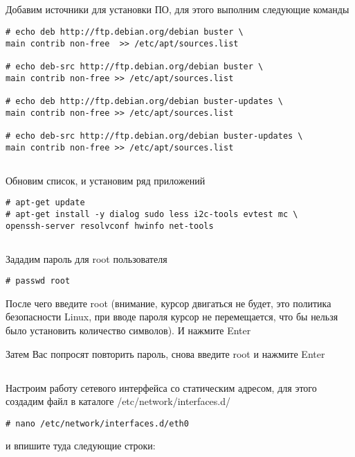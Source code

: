 \subsection{}Добавим источники для установки ПО, для этого выполним следующие команды 
\begin{lstlisting}[style=bash]
# echo deb http://ftp.debian.org/debian buster \
main contrib non-free  >> /etc/apt/sources.list

# echo deb-src http://ftp.debian.org/debian buster \
main contrib non-free >> /etc/apt/sources.list

# echo deb http://ftp.debian.org/debian buster-updates \
main contrib non-free >> /etc/apt/sources.list

# echo deb-src http://ftp.debian.org/debian buster-updates \
main contrib non-free >> /etc/apt/sources.list
\end{lstlisting}

\subsection{} Обновим список, и установим ряд приложений
\begin{lstlisting}[style=bash]
# apt-get update
# apt-get install -y dialog sudo less i2c-tools evtest mc \
openssh-server resolvconf hwinfo net-tools
\end{lstlisting}

\subsection{}Зададим пароль для root пользователя
\begin{lstlisting}[style=bash]
# passwd root
\end{lstlisting}
После чего введите root (внимание, курсор двигаться не будет, это политика безопасности Linux, при вводе пароля курсор не перемещается, что бы нельзя было установить количество символов). И нажмите Enter

Затем Вас попросят повторить пароль, снова введите root и нажмите Enter

\subsection{}Настроим работу сетевого интерфейса со статическим адресом, для этого создадим файл в каталоге /etc/network/interfaces.d/

\begin{lstlisting}[style=bash]
# nano /etc/network/interfaces.d/eth0
\end{lstlisting}
и впишите туда следующие строки:

